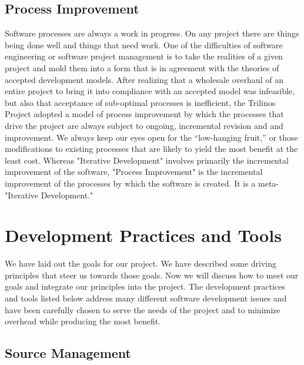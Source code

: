 \documentclass[12pt,relax]{article}
\begin{document}
\subsection{Process Improvement}

Software processes are always a work in progress.  On any project there are
things being done well and things that need work.  One of the difficulties of 
software engineering or software project management is to take the realities
of a given project and mold them into a form that is in agreement with the
theories of accepted development models.  After realizing that a wholesale 
overhaul of an entire project to bring it into compliance with an accepted
model was infeasible, but also that acceptance of sub-optimal processes is
inefficient, the Trilinos Project adopted a model of process improvement by
which the processes that drive the project are always subject to ongoing,
incremental revision and and improvement.  We always keep our eyes open for the 
``low-hanging fruit,'' or those modifications to existing processes that are
likely to yield the most benefit at the least cost.  Whereas "Iterative
Development" involves primarily the incremental improvement of the software,
"Process Improvement" is the incremental improvement of the processes by which
the software is created.  It is a meta-"Iterative Development."

\clearpage


\section{Development Practices and Tools}
\label{Section:Development Practices and Tools}

We have laid out the goals for our project.  We have described some driving
principles that steer us towards those goals.  Now we will discuss how to meet 
our goals and integrate our principles into the project.  The development
practices and tools listed below address many different software development
issues and have been carefully chosen to serve the needs of the project and to
minimize overhead while producing the most benefit.


\subsection{Source Management}
\end{document}
